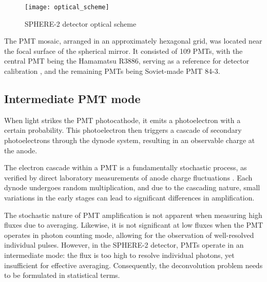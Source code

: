 \begin{figure}
	\centering
	\texttt{[image: optical\_scheme]}
	\caption{SPHERE-2 detector optical scheme}
	\label{pic:sphere-detector-optical-scheme}
\end{figure}

The PMT mosaic, arranged in an approximately hexagonal grid, was located near the focal surface of the spherical mirror. It consisted of 109 PMTs, with the central PMT being the Hamamatsu R3886, serving as a reference for detector calibration \cite{SphereCalibration2016}, and the remaining PMTs being Soviet-made PMT 84-3.

\subsection{Intermediate PMT mode}
\label{sec:photon-to-phels-conversion}

When light strikes the PMT photocathode, it emits a photoelectron with a certain probability. This photoelectron then triggers a cascade of secondary photoelectrons through the dynode system, resulting in an observable charge at the anode.

The electron cascade within a PMT is a fundamentally stochastic process, as verified by direct laboratory measurements of anode charge fluctuations \cite[Fig. 9]{SphereCalibration2016}. Each dynode undergoes random multiplication, and due to the cascading nature, small variations in the early stages can lead to significant differences in amplification.

The stochastic nature of PMT amplification is not apparent when measuring high fluxes due to averaging. Likewise, it is not significant at low fluxes when the PMT operates in photon counting mode, allowing for the observation of well-resolved individual pulses. However, in the SPHERE-2 detector, PMTs operate in an intermediate mode: the flux is too high to resolve individual photons, yet insufficient for effective averaging. Consequently, the deconvolution problem needs to be formulated in statistical terms.